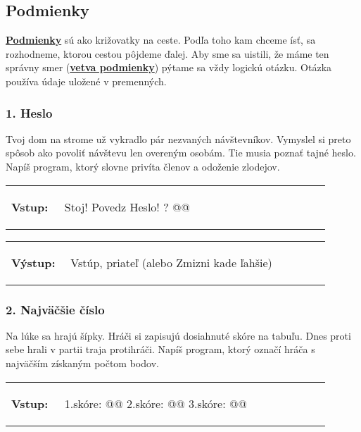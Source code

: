 \subsection{Podmienky}
\underline{\textbf{Podmienky}} sú ako križovatky na ceste. Podľa toho kam chceme ísť, sa rozhodneme, ktorou cestou pôjdeme ďalej. Aby sme sa uistili, že máme ten správny smer (\underline{\textbf{vetva podmienky}}) pýtame sa vždy logickú otázku. Otázka používa údaje uložené v premenných.

\subsubsection*{1. Heslo}
Tvoj dom na strome už vykradlo pár nezvaných návštevníkov. Vymyslel si preto spôsob ako povoliť návštevu len overeným osobám. Tie musia poznať tajné heslo. Napíš program, ktorý slovne privíta členov a odoženie zlodejov.

\begin{tabular}{@{}p{0.15\linewidth}p{0.75\linewidth}}
\textbf{\small Vstup:} &
\vspace{-3em}
\begin{code}
Stoj! Povedz Heslo!
? @\fbox{\phantom{vstup}}@
\end{code}
\end{tabular}

\vspace{-2em}
\begin{tabular}{@{}p{0.15\linewidth}p{0.75\linewidth}}
\textbf{\small Výstup:} &
\vspace{-3em}
\begin{code}
Vstúp, priateľ
(alebo Zmizni kade ľahšie)
\end{code}
\end{tabular}
\vspace{-2em}

\subsubsection*{2. Najväčšie číslo}
Na lúke sa hrajú šípky. Hráči si zapisujú dosiahnuté skóre na tabuľu. Dnes proti sebe hrali v partii traja protihráči. Napíš program, ktorý označí hráča s najväčším získaným počtom bodov.

\begin{tabular}{@{}p{0.15\linewidth}p{0.75\linewidth}}
\textbf{\small Vstup:} &
\vspace{-3em}
\begin{code}
1.skóre: @\fbox{\phantom{vstup}}@
2.skóre: @\fbox{\phantom{vstup}}@
3.skóre: @\fbox{\phantom{vstup}}@
\end{code}
\end{tabular}

